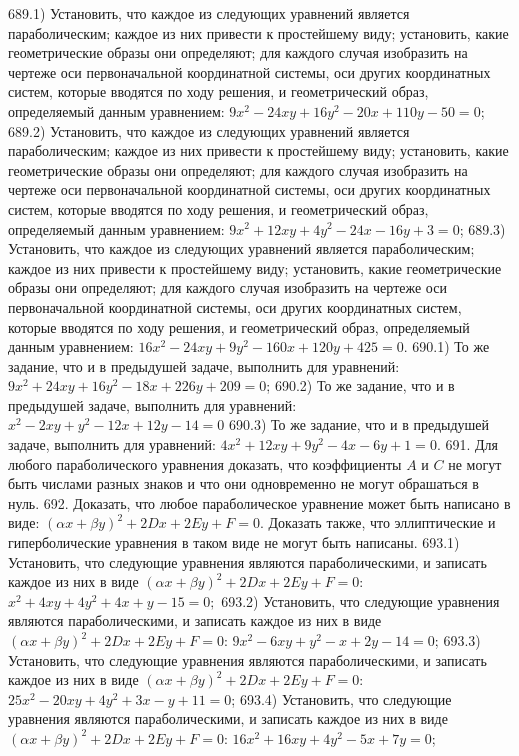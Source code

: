 689.1) Установить, что каждое из следующих уравнений является параболическим; каждое из них привести к простейшему виду; установить, какие геометрические образы они определяют; для каждого случая изобразить на чертеже оси первоначальной координатной системы, оси других координатных систем, которые вводятся по ходу решения, и геометрический образ, определяемый данным уравнением: $9 x^2-24 x y+16 y^2-20 x+110 y-50=0$;
689.2) Установить, что каждое из следующих уравнений является параболическим; каждое из них привести к простейшему виду; установить, какие геометрические образы они определяют; для каждого случая изобразить на чертеже оси первоначальной координатной системы, оси других координатных систем, которые вводятся по ходу решения, и геометрический образ, определяемый данным уравнением: $9 x^2+12 x y+4 y^2-24 x-16 y+3=0$;
689.3) Установить, что каждое из следующих уравнений является параболическим; каждое из них привести к простейшему виду; установить, какие геометрические образы они определяют; для каждого случая изобразить на чертеже оси первоначальной координатной системы, оси других координатных систем, которые вводятся по ходу решения, и геометрический образ, определяемый данным уравнением: $16 x^2-24 x y+9 y^2-160 x+120 y+425=0$.
690.1) То же задание, что и в предыдушей задаче, выполнить для уравнений: $9 x^2+24 x y+16 y^2-18 x+226 y+209=0$;
690.2) То же задание, что и в предыдушей задаче, выполнить для уравнений: $x^2-2 x y+y^2-12 x+12 y-14=0$
690.3) То же задание, что и в предыдушей задаче, выполнить для уравнений: $4 x^2+12 x y+9 y^2-4 x-6 y+1=0$.
691. Для любого параболического уравнения доказать, что коэффициенты $A$ и $C$ не могут быть числами разных знаков и что они одновременно не могут обрашаться в нуль.
692. Доказать, что любое параболическое уравнение может быть написано в виде: $(\alpha x+\beta y)^2+2 D x+2 E y+F=0$. Доказать также, что эллиптические и гиперболические уравнения в таком виде не могут быть написаны.
693.1) Установить, что следующие уравнения являются параболическими, и записать каждое из них в виде $(\alpha x+\beta y)^2+2 D x+2 E y+F=0$: $x^2+4 x y+4 y^2+4 x+y-15=0 ;$
693.2) Установить, что следующие уравнения являются параболическими, и записать каждое из них в виде $(\alpha x+\beta y)^2+2 D x+2 E y+F=0$: $9 x^2-6 x y+y^2-x+2 y-14=0$;
693.3) Установить, что следующие уравнения являются параболическими, и записать каждое из них в виде $(\alpha x+\beta y)^2+2 D x+2 E y+F=0$: $25 x^2-20 x y+4 y^2+3 x-y+11=0$;
693.4) Установить, что следующие уравнения являются параболическими, и записать каждое из них в виде $(\alpha x+\beta y)^2+2 D x+2 E y+F=0$: $16 x^2+16 x y+4 y^2-5 x+7 y=0$;
